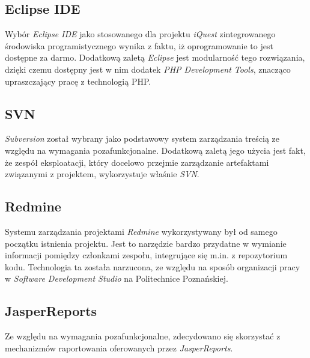 \subsection{Eclipse IDE}
\label{Chapter621}

Wybór \emph{Eclipse IDE} jako stosowanego dla projektu \textit{iQuest} zintegrowanego środowiska programistycznego wynika z faktu, iż oprogramowanie to jest dostępne za darmo. Dodatkową zaletą \textit{Eclipse} jest modularność tego rozwiązania, dzięki czemu dostępny jest w nim dodatek \emph{PHP Development Tools}, znacząco upraszczający pracę z technologią PHP.

\subsection{SVN}
\label{Chapter632}

\emph{Subversion} został wybrany jako podstawowy system zarządzania treścią ze względu na wymagania pozafunkcjonalne. Dodatkową zaletą jego użycia jest fakt, że zespół eksploatacji, który docelowo przejmie zarządzanie artefaktami związanymi z projektem, wykorzystuje właśnie \textit{SVN}.

\subsection{Redmine}
\label{Chapter633}

Systemu zarządzania projektami \emph{Redmine} wykorzystywany był od samego początku istnienia projektu. Jest to narzędzie bardzo przydatne w wymianie informacji pomiędzy członkami zespołu, integrujące się m.in. z repozytorium kodu. Technologia ta została narzucona, ze względu na sposób organizacji pracy w \textit{Software Development Studio} na Politechnice Poznańskiej.

\subsection{JasperReports}
\label{Chapter634}

Ze względu na wymagania pozafunkcjonalne, zdecydowano się skorzystać z mechanizmów raportowania oferowanych przez \emph{JasperReports}.